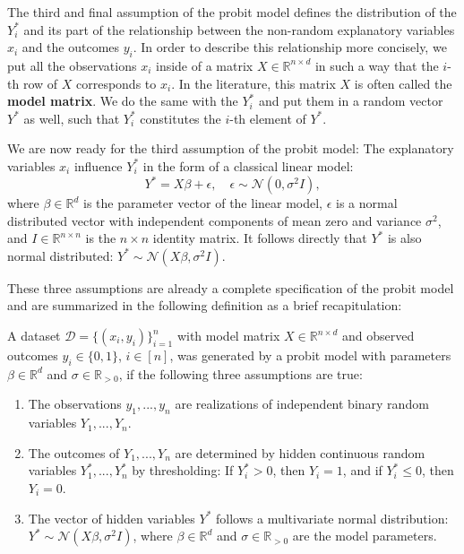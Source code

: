 The third and final assumption of the probit model defines the
distribution of the $Y_i^\ast$ and its part of the relationship
between the non-random explanatory variables $x_i$ and the outcomes $y_i$.
In order to describe this relationship more concisely,
we put all the observations $x_i$ inside of a
matrix $X \in \mathbb{R}^{n \times d}$ in such a way that
the $i$-th row of $X$ corresponds to $x_i$.
In the literature, this matrix $X$ is often called the \textbf{model matrix}.
We do the same with the $Y_i^\ast$ and put them in a
random vector $Y^\ast$ as well, such that $Y_i^\ast$ constitutes
the $i$-th element of $Y^\ast$.

We are now ready for the third assumption of the probit model:
The explanatory variables
$x_i$ influence $Y_i^\ast$ in the form of a classical linear model:
\begin{equation}
    Y^\ast = X \beta + \epsilon, \quad \epsilon \sim \mathcal{N}(0, \sigma^2 I),
\end{equation}
where $\beta \in \mathbb{R}^d$ is the parameter vector of the linear model,
$\epsilon$ is a normal distributed vector with independent components of
mean zero and variance $\sigma^2$,
and
$I \in \mathbb{R}^{n \times n}$ is the $n \times n$ identity matrix.
It follows directly that $Y^\ast$ is also normal distributed:
$Y^\ast \sim \mathcal{N}(X \beta, \sigma^2 I)$.

These three assumptions are already a complete specification of the
probit model and are summarized in the following definition as a
brief recapitulation:

\begin{definition}
    A dataset $\mathcal{D} = \{(x_i, y_i)\}_{i=1}^n$ with model matrix
    $X \in \mathbb{R}^{n \times d}$ and observed outcomes
    $y_i \in \{0, 1\}$, $i \in [n]$, was generated by a probit model with
    parameters $\beta \in \mathbb{R}^d$ and $\sigma \in \mathbb{R}_{>0}$, if
    the following three assumptions are true:
    \begin{enumerate}
        \item The observations $y_1, ..., y_n$ are realizations of independent
              binary random variables $Y_1, ..., Y_n$.
        \item The outcomes of $Y_1, ..., Y_n$ are determined by hidden
              continuous random variables $Y_1^\ast, ..., Y_n^\ast$ by
              thresholding: If $Y_i^\ast > 0$, then $Y_i = 1$, and if
              $Y_i^\ast \leq 0$, then $Y_i = 0$.
        \item The vector of hidden variables $Y^\ast$ follows a multivariate
              normal distribution:
              $Y^\ast \sim \mathcal{N}(X \beta, \sigma^2 I)$,
              where $\beta \in \mathbb{R}^d$ and $\sigma \in \mathbb{R}_{>0}$
              are the model parameters.
    \end{enumerate}
\end{definition}

